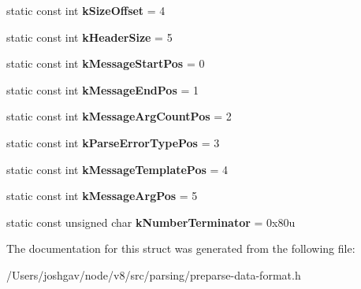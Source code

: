 \begin{DoxyCompactItemize}
\item 
static const int {\bfseries k\+Size\+Offset} = 4\hypertarget{structv8_1_1internal_1_1_preparse_data_constants_ad3dedecab84154a319f67076a1dd8da6}{}\label{structv8_1_1internal_1_1_preparse_data_constants_ad3dedecab84154a319f67076a1dd8da6}

\item 
static const int {\bfseries k\+Header\+Size} = 5\hypertarget{structv8_1_1internal_1_1_preparse_data_constants_a283e1dc7453162bb98007cca6e1654e0}{}\label{structv8_1_1internal_1_1_preparse_data_constants_a283e1dc7453162bb98007cca6e1654e0}

\item 
static const int {\bfseries k\+Message\+Start\+Pos} = 0\hypertarget{structv8_1_1internal_1_1_preparse_data_constants_aa63c89425182c0e945ba74fd103472e3}{}\label{structv8_1_1internal_1_1_preparse_data_constants_aa63c89425182c0e945ba74fd103472e3}

\item 
static const int {\bfseries k\+Message\+End\+Pos} = 1\hypertarget{structv8_1_1internal_1_1_preparse_data_constants_a492f166ee50324e0515db678c1489cc7}{}\label{structv8_1_1internal_1_1_preparse_data_constants_a492f166ee50324e0515db678c1489cc7}

\item 
static const int {\bfseries k\+Message\+Arg\+Count\+Pos} = 2\hypertarget{structv8_1_1internal_1_1_preparse_data_constants_af767699ba29647e0c763268d29dcbec3}{}\label{structv8_1_1internal_1_1_preparse_data_constants_af767699ba29647e0c763268d29dcbec3}

\item 
static const int {\bfseries k\+Parse\+Error\+Type\+Pos} = 3\hypertarget{structv8_1_1internal_1_1_preparse_data_constants_a3188313e27000cca1a5bff8ad3809340}{}\label{structv8_1_1internal_1_1_preparse_data_constants_a3188313e27000cca1a5bff8ad3809340}

\item 
static const int {\bfseries k\+Message\+Template\+Pos} = 4\hypertarget{structv8_1_1internal_1_1_preparse_data_constants_a8c4ee540c1788d7f44fd8f2ab379aa1f}{}\label{structv8_1_1internal_1_1_preparse_data_constants_a8c4ee540c1788d7f44fd8f2ab379aa1f}

\item 
static const int {\bfseries k\+Message\+Arg\+Pos} = 5\hypertarget{structv8_1_1internal_1_1_preparse_data_constants_a1538af2b3f1666df752525dcc1a21141}{}\label{structv8_1_1internal_1_1_preparse_data_constants_a1538af2b3f1666df752525dcc1a21141}

\item 
static const unsigned char {\bfseries k\+Number\+Terminator} = 0x80u\hypertarget{structv8_1_1internal_1_1_preparse_data_constants_abd7dac444caba692dbe79033ca6abcba}{}\label{structv8_1_1internal_1_1_preparse_data_constants_abd7dac444caba692dbe79033ca6abcba}

\end{DoxyCompactItemize}


The documentation for this struct was generated from the following file\+:\begin{DoxyCompactItemize}
\item 
/\+Users/joshgav/node/v8/src/parsing/preparse-\/data-\/format.\+h\end{DoxyCompactItemize}
